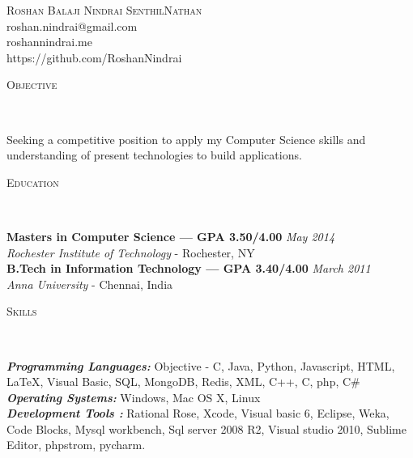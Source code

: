 \documentclass[9pt]{article}
\newenvironment{changemargin}[2]{%
  \begin{list}{}{%
    \setlength{\topsep}{0pt}%
    \setlength{\leftmargin}{#1}%
    \setlength{\rightmargin}{#2}%
    \setlength{\listparindent}{\parindent}%
    \setlength{\itemindent}{\parindent}%
    \setlength{\parsep}{\parskip}%
  }%
  \item[]}{\end{list}
}
\newcommand{\lineover}{
	\begin{changemargin}{-0.05in}{-0.05in}
		\vspace*{-8pt}
		\hrulefill \\
		\vspace*{-2pt}
	\end{changemargin}
}
\newcommand{\header}[1]{
	\begin{changemargin}{-0.5in}{-0.5in}
		\scshape{#1}\\
  	\lineover
	\end{changemargin}
}
\newcommand{\contact}[4]{
	\begin{changemargin}{-0.5in}{-0.5in}
		\begin{center}
			{\Large \scshape {#1}}\\ \smallskip
			{#2}\\ \smallskip 
			{#3}\\ \smallskip
			{#4}\smallskip
		\end{center}
	\end{changemargin}
}
\newenvironment{body} {
	\vspace*{-16pt}
	\begin{changemargin}{-0.25in}{-0.5in}
  }	
	{\end{changemargin}
}
\begin{document}
\contact{Roshan Balaji Nindrai SenthilNathan}{roshan.nindrai@gmail.com}{roshannindrai.me}{https://github.com/RoshanNindrai}


\header{Objective}

\begin{body}
	\vspace{14pt}
	Seeking a competitive position to apply my Computer Science skills and understanding of present technologies to build applications.
\end{body}

\smallskip


\header{Education}

\begin{body}
	\vspace{14pt}
	\textbf{Masters in Computer Science\hspace{23pt} --- GPA 3.50/4.00}{} \hfill \emph{May 2014}{} \\
	\emph{Rochester Institute of Technology} - Rochester, NY{} \\
  \medskip
	\textbf{B.Tech in Information Technology --- GPA 3.40/4.00} \hfill \emph{March 2011} \\
	\emph{Anna University} - Chennai, India\\
\end{body}

\smallskip

\header{Skills}

\begin{body}
	\vspace{14pt}
	\emph{\textbf{Programming Languages:}}{} Objective - C,  Java, Python,  Javascript, HTML,  \LaTeX, Visual Basic, SQL, MongoDB, Redis, XML, C++, C, php,  C\#\\
	\medskip
	\emph{\textbf{Operating Systems:}}{} Windows, Mac OS X, Linux\\
\medskip
\emph{\textbf{Development Tools :}}{} Rational Rose, Xcode, Visual basic 6, Eclipse, Weka, Code Blocks, Mysql workbench, Sql server 2008 R2, Visual studio 2010, Sublime Editor, phpstrom, pycharm.\\
\end{body}
\end{document}
